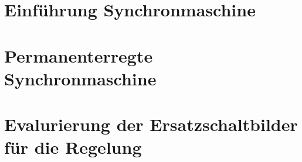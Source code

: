 \section{Einführung Synchronmaschine}\label{sec:synchron}

\section{Permanenterregte Synchronmaschine}\label{sec:pmsm}

\section{Evalurierung der Ersatzschaltbilder für die Regelung}\label{sec:esb}



